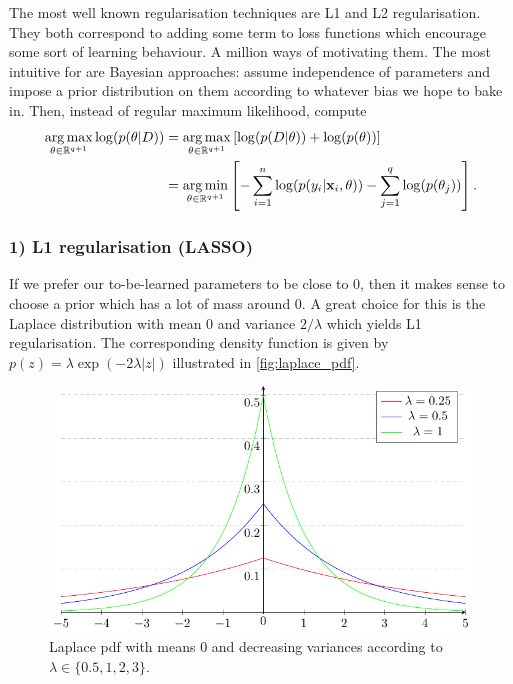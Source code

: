 \documentclass[11pt]{article}
\begin{document}
The most well known regularisation techniques are L1 and L2 regularisation. They both correspond to adding some term to loss functions which encourage some sort of learning behaviour. A million ways of motivating them. The most intuitive for are Bayesian approaches: assume independence of parameters and impose a prior distribution on them according to whatever bias we hope to bake in. Then, instead of regular maximum likelihood, compute
\begin{align*}
    \operatorname*{arg\,max}_{\theta\in\mathbb{R}^{q+1}}\log(p(\theta|D))
    &=
    \operatorname*{arg\,max}_{\theta\in\mathbb{R}^{q+1}}\left[\log(p(D|\theta))+\log(p(\theta))\right]\\
    &=
    \operatorname*{arg\,min}_{\theta\in\mathbb{R}^{q+1}}\left[-\sum_{i=1}^n\log(p(y_i|\mathbf{x}_i,\theta))-\sum_{j=1}^q\log(p(\theta_j))\right].
\end{align*}

\subsubsection*{1) L1 regularisation (LASSO)}
If we prefer our to-be-learned parameters to be close to 0, then it makes sense to choose a prior which has a lot of mass around 0. A great choice for this is the Laplace distribution with mean 0 and variance $2/\lambda$ which yields L1 regularisation. The corresponding density function is given by $p(z)=\lambda\exp(-2\lambda|z|)$ illustrated in \autoref{fig:laplace_pdf}.

\begin{figure}[t]
    \centering
    \includegraphics[width=\columnwidth]{./figures/supervised_learning/laplace_pdf.pdf}
    \caption{Laplace pdf with means 0 and decreasing variances according to $\lambda\in\{0.5,1,2,3\}$.}
    \label{fig:laplace_pdf}
\end{figure}
\end{document}
